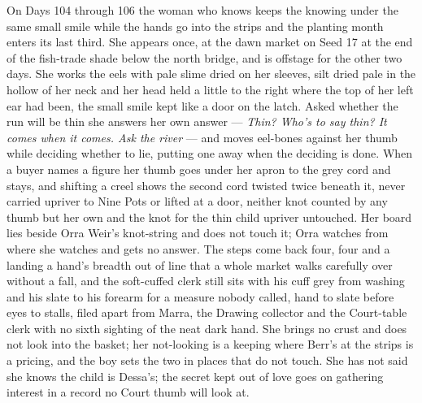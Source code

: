 \documentclass{design/chronicle}
\begin{document}
{On Days 104 through 106 the woman who knows keeps the knowing under the same small smile while the hands go into the strips and the planting month enters its last third. She appears once, at the dawn market on Seed 17 at the end of the fish-trade shade below the north bridge, and is offstage for the other two days. She works the eels with pale slime dried on her sleeves, silt dried pale in the hollow of her neck and her head held a little to the right where the top of her left ear had been, the small smile kept like a door on the latch. Asked whether the run will be thin she answers her own answer --- \emph{Thin? Who’s to say thin? It comes when it comes. Ask the river} --- and moves eel-bones against her thumb while deciding whether to lie, putting one away when the deciding is done. When a buyer names a figure her thumb goes under her apron to the grey cord and stays, and shifting a creel shows the second cord twisted twice beneath it, never carried upriver to Nine Pots or lifted at a door, neither knot counted by any thumb but her own and the knot for the thin child upriver untouched. Her board lies beside Orra Weir’s knot-string and does not touch it; Orra watches from where she watches and gets no answer. The steps come back four, four and a landing a hand’s breadth out of line that a whole market walks carefully over without a fall, and the soft-cuffed clerk still sits with his cuff grey from washing and his slate to his forearm for a measure nobody called, hand to slate before eyes to stalls, filed apart from Marra, the Drawing collector and the Court-table clerk with no sixth sighting of the neat dark hand. She brings no crust and does not look into the basket; her not-looking is a keeping where Berr’s at the strips is a pricing, and the boy sets the two in places that do not touch. She has not said she knows the child is Dessa’s; the secret kept out of love goes on gathering interest in a record no Court thumb will look at.

}
\end{document}
